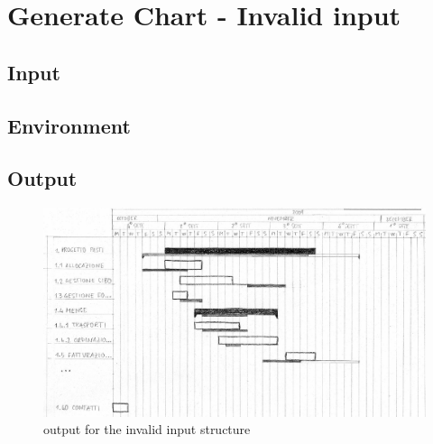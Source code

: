 \chapter{Generate Chart - Invalid input}
\label{chap:genChartInvInput}

\section{Input}

\section{Environment}

\section{Output}
\begin{figure} 
\centering
\includegraphics[width=1\textwidth]{case_spec/generate_Gantt/invalidOutput.png}
\caption{output for the invalid input structure}
\end{figure}
